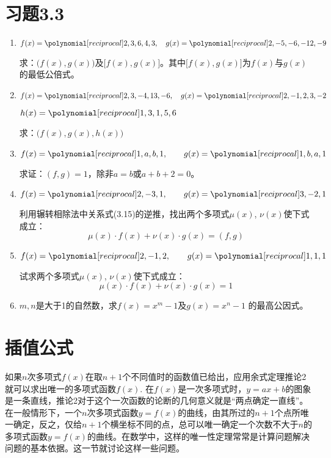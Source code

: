\section*{习题3.3}

\begin{enumerate}
    \item $f(x)=\poly{2,3,6,4,3},\quad g(x)=\poly{2,-5,-6,-12,-9}$

求：$\bigl(f(x),g(x)\bigr)$及$\bigl[f(x),g(x)\bigr]$。其中$\bigl[f(x),g(x)\bigr]$为$f(x)$与$g(x)$的最低公倍式。

\item $f(x)=\poly{2,3,-4,13,-6},\quad g(x)=\poly{2,-1,2,3,-2}$

$h(x)=\poly{1,3,1,5,6}$

求：$\bigl(f(x),g(x),h(x)\bigr)$

\item $f(x)=\poly{1,a,b,1},\qquad g(x)=\poly{1,b,a,1}$

求证：$(f,g)=1$，除非$a=b$或$a+b+2=0$。
\item $f(x)=\poly{2,-3,1},\qquad g(x)=\poly{3,-2,1}$

利用辗转相除法中关系式(3.15)的逆推，找出两个多项式$\mu(x)$, $\nu(x)$使下式成立：
\[\mu(x)\cdot f(x)+\nu(x)\cdot g(x)=(f,g)\]

\item $f(x)=\poly{2,-1,2},\qquad g(x)=\poly{1,1,1}$

试求两个多项式$\mu(x)$, $\nu(x)$使下式成立：
\[\mu(x)\cdot f(x)+\nu(x)\cdot g(x)=1\]

\item $m,n$是大于1的自然数，求$f(x)=x^m-1$及$g(x)=x^n-1$
的最高公因式。
\end{enumerate}


\section{插值公式}
如果$n$次多项式$f(x)$在取$n+1$个不同值时的函数值已给出，应用余式定理推论2就可以求出唯一的多项式函数$f(x)$. 在$f(x)$是一次多项式时，$y=ax+b$的图象是一条直线，推论2对于这个一次函数的论断的几何意义就是“两点确定一直线”。在一般情形下，一个$n$次多项式函数$y=f(x)$的曲线，由其所过的$n+1$个点所唯一确定，反之，仅给$n+1$个横坐标不同的点，总可以唯一确定一个次数不大于$n$的多项式函数$y=f(x)$的曲线。在数学中，这样的唯一性定理常常是计算问题解决问题的基本依据。这一节就讨论这样一些问题。
